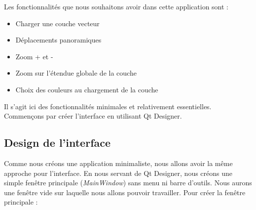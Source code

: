 Les fonctionnalit\'es que nous souhaitons avoir dans cette application sont :

\begin{itemize}
\item Charger une couche vecteur
\item D\'eplacements panoramiques
\item Zoom + et -
\item Zoom sur l'\'etendue globale de la couche
\item Choix des couleurs au chargement de la couche
\end{itemize} 

Il s'agit ici des fonctionnalit\'es minimales et relativement essentielles. Commen\c{c}ons par cr\'eer l'interface en utilisant Qt Designer.

\subsection{Design de l'interface}

Comme nous cr\'eons une application minimaliste, nous allons avoir la m\^eme approche pour l'interface. En nous servant de Qt Designer, nous cr\'eons une simple fen\^etre principale (\textit{MainWindow}) sans menu ni barre d'outils. Nous aurons une fen\^etre vide sur laquelle nous allons pouvoir travailler. Pour cr\'eer la fen\^etre principale :

